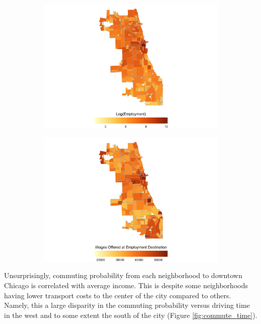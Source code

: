\documentclass[12pt]{article}
\begin{document}
\begin{figure}[h!]
\centering
    \caption{Employment and Wage by Neighborhood}
    \begin{subfigure}{0.49\textwidth}
         \centering
         \includegraphics[width=\textwidth]
         {Pset1/code/lodes_diagnostics_files/figure-html/fig-employment-1.png}
    \end{subfigure}  
    \begin{subfigure}{0.49\textwidth}
         \centering
         \includegraphics[width=\linewidth]{Pset1/code/lodes_diagnostics_files/figure-html/fig-workwages-1.png}
    \end{subfigure}
    \label{fig:emp_wage}
\end{figure}
Unsurprisingly, commuting probability from each neighborhood to downtown Chicago is correlated with average income. This is despite some neighborhoods having lower transport costs to the center of the city compared to others. Namely, this a large disparity in the commuting probability versus driving time in the west and to some extent the south of the city (Figure \ref{fig:commute_time}). 
\end{document}
